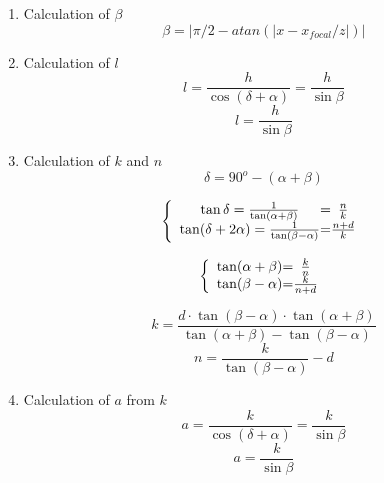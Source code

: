 \documentclass[12pt]{article}
\begin{document}
\begin{enumerate}
\item Calculation of $\beta$	
	  \begin{equation} 	
	\boxed{\beta=|\pi/2- atan(|x-x_{focal}/z|)|}
	\end{equation}

\item Calculation of $l$				
	$$l=\frac{h}{\cos(\delta+\alpha)}=\frac{h}{\sin\beta}$$
	  \begin{equation} 	
	\boxed{l=\frac{h}{\sin\beta}}
	\end{equation}
\item Calculation of $k$ and $n$
	$$\delta=90^{o}-(\alpha+\beta)$$

	\[
	\left \{
	\begin{array}{c @{=} c}
    \tan\delta = \frac{1}{\tan(\alpha+\beta)}& \frac{n}{k} \\
   	\tan(\delta+2\alpha) = \frac{1}{\tan(\beta-\alpha)} & \frac{n+d}{k} \\
	\end{array}
	\right.
	\]
	
	\[
	\left \{
	\begin{array}{c @{=} c}
    \tan(\alpha+\beta)& \frac{k}{n} \\
   	\tan(\beta-\alpha) & \frac{k}{n+d} \\
	\end{array}
	\right.
	\]
	
	
\begin{equation} 	
	\boxed{k=\frac{d\cdot\tan(\beta-\alpha)\cdot\tan(\alpha+\beta)}{\tan(\alpha+\beta) - 	\tan(\beta-\alpha)}}
\end{equation}	
\begin{equation} 	
	\boxed{n=\frac{k}{\tan(\beta-\alpha)} - d}
	\end{equation}	
		
%	
\item Calculation of $a$ from $k$
	$$a=\frac{k}{\cos(\delta+\alpha)}=\frac{k}{\sin\beta}$$
	  \begin{equation} 	
	\boxed{a=\frac{k}{\sin\beta}}
	\end{equation}


\end{enumerate}
\end{document}
